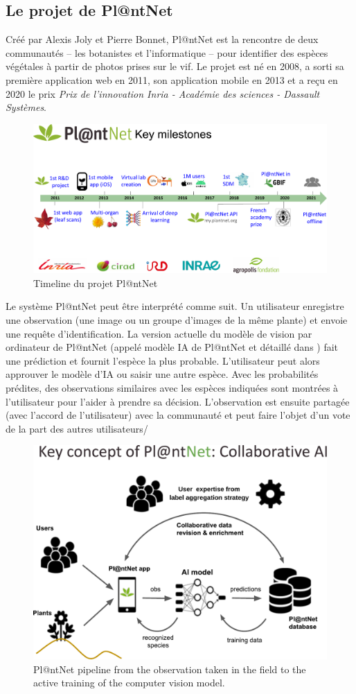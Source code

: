 \subsection{Le projet de Pl@ntNet}
Créé par Alexis Joly et Pierre Bonnet, Pl@ntNet \citep{plantet} est la rencontre de deux communautés -- les botanistes et l'informatique -- pour identifier des espèces végétales à partir de photos prises sur le vif.
Le projet est né en 2008, a sorti sa première application web en 2011, son application mobile en 2013 et a reçu en 2020 le prix \emph{Prix de l'innovation Inria - Académie des sciences - Dassault Systèmes}.
\begin{figure}[tbh]
    \centering
    \includegraphics[width=.8\textwidth, clip, trim={0cm 0cm 0cm 2.5cm}]{chapters/images/Pl@ntNet-overview-Janv-2022.pdf}
    \caption{Timeline du projet Pl@ntNet}
    \label{fig:timeline-plantnet}
\end{figure}

Le système Pl@ntNet peut être interprété comme suit. Un utilisateur enregistre une observation (une image ou un groupe d'images de la même plante) et envoie une requête d'identification.
La version actuelle du modèle de vision par ordinateur de Pl@ntNet (appelé modèle IA de Pl@ntNet et détaillé dans ) fait une prédiction et fournit l'espèce la plus probable.
L'utilisateur peut alors approuver le modèle d'IA ou saisir une autre espèce.
Avec les probabilités prédites, des observations similaires avec les espèces indiquées sont montrées à l'utilisateur pour l'aider à prendre sa décision.
L'observation est ensuite partagée (avec l'accord de l'utilisateur) avec la communauté et peut faire l'objet d'un vote de la part des autres utilisateurs/

\begin{figure}[htb]
    \centering
    \includegraphics[width=.65\textwidth, clip, trim={0cm 0cm 0cm 2cm}]{chapters/images/cooperative learning Pl@ntNet schema.pdf}
    \caption{Pl@ntNet pipeline from the observation taken in the field to the active training of the computer vision model.}
\end{figure}

